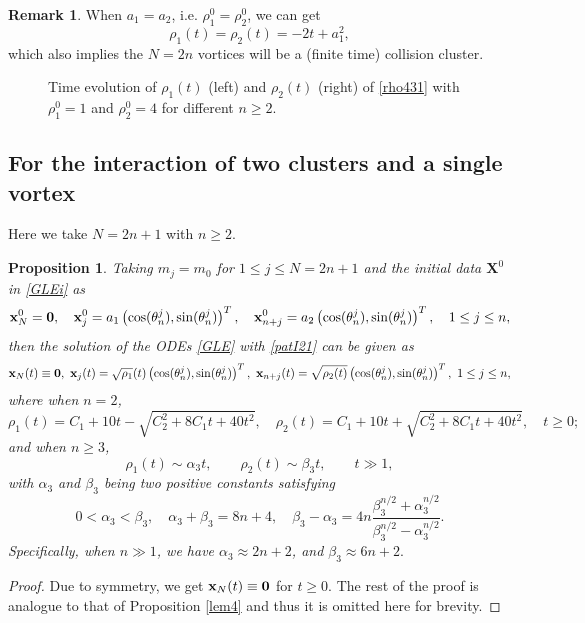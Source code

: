 \documentclass{aims}
\theoremstyle{plain}
\newtheorem{proposition}{Proposition}[section]
\theoremstyle{definition}
\newtheorem{remark}{Remark}[section]
\newcommand{\bx}{{\mathbf x}}
\newcommand{\bX}{{\mathbf X}}
\newcommand{\be} {\begin{equation}}
\newcommand{\ee}{\end{equation}}
\begin{document}
\begin{remark}
When $a_1=a_2$, i.e. $\rho_1^0=\rho_2^0$, we can get
\begin{equation*}
\rho_1(t)=\rho_2(t)=-2t+a_1^2,
\end{equation*}
which also implies the  $N=2n$ vortices will be a (finite time) collision cluster.
\end{remark}

\begin{figure}[t!]
\centerline{
}
\caption{Time evolution of $\rho_1(t)$ (left) and $\rho_2(t)$ (right)
of \eqref{rho431} with $\rho_1^0=1$ and $\rho_2^0=4$ for different $n\ge2$.}
\label{rho122}
\end{figure}


\subsection{For the interaction of two clusters and a single vortex}
Here we take $N=2n+1$ with $n\ge2$.

\begin{proposition}\label{lem5}
Taking $m_j=m_0$  for $1\le j\le N=2n+1$ and
the initial data $\bX^0$ in \eqref{GLEi} as
\be\label{patI21}
\bx_{N}^0={\bf 0}, \quad \mathbf x_j^0=a_1\left(\cos(\theta_n^j),\sin(\theta_n^j)\right)^T,\quad
\mathbf x_{n+j}^0=a_2\left(\cos(\theta_n^j),\sin(\theta_n^j)\right)^T,
\quad 1\le j\le n,
\ee
then the solution of the ODEs \eqref{GLE} with \eqref{patI21} can be given as
\be\label{solgle21}
\bx_{N}(t)\equiv {\bf 0},\ \mathbf x_j(t)=\sqrt{\rho_1}(t)\left(\cos(\theta_n^j),\sin(\theta_n^j)\right)^T,\
\mathbf x_{n+j}(t)=\sqrt{\rho_2(t)}\left(\cos(\theta_n^j),\sin(\theta_n^j)\right)^T,
\  1\le j\le n,
\ee
where when $n=2$,
\be
\rho_1(t)=C_1+10t-
\sqrt{C_2^2+8C_1t+40t^2}, \quad
\rho_2(t)=C_1+10t+
\sqrt{C_2^2+8C_1t+40t^2}, \quad
t\ge0; \nonumber
\ee
and when $n\ge3$,
\be
\rho_1(t)\sim \alpha_3 t,  \qquad \rho_2(t)\sim \beta_3 t, \qquad
t\gg 1, \nonumber
\ee
with $\alpha_3$ and $\beta_3$ being two positive constants
satisfying
\be
0<\alpha_3<\beta_3, \quad \alpha_3+\beta_3=8n+4,\quad
\beta_3-\alpha_3=4n\frac{\beta_3^{n/2}+\alpha_3^{n/2}}
{\beta_3^{n/2}-\alpha_3^{n/2}}. \nonumber
\ee
Specifically, when $n\gg1$, we have $\alpha_3\approx 2n+2$, and $\beta_3\approx 6n+2.$
\end{proposition}

\begin{proof}
Due to symmetry, we get $\bx_N(t)\equiv {\bf 0}$ for $t\ge0$.
The rest of the proof is analogue to that of Proposition \ref{lem4} and thus it is
omitted here for brevity.
\end{proof}
\end{document}
